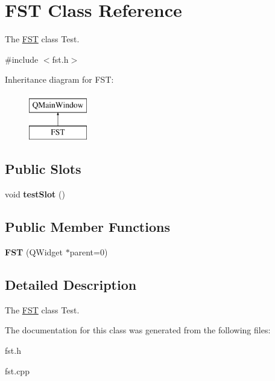 \hypertarget{classFST}{\section{F\-S\-T Class Reference}
\label{classFST}
}


The \hyperlink{classFST}{F\-S\-T} class Test.  




{\ttfamily \#include $<$fst.\-h$>$}

Inheritance diagram for F\-S\-T\-:\begin{figure}[H]
\begin{center}
\leavevmode
\includegraphics[height=2.000000cm]{classFST}
\end{center}
\end{figure}
\subsection*{Public Slots}
\begin{DoxyCompactItemize}
\item 
\hypertarget{classFST_a344cc8383100c7e3c0173c231550c122}{void {\bfseries test\-Slot} ()}\label{classFST_a344cc8383100c7e3c0173c231550c122}

\end{DoxyCompactItemize}
\subsection*{Public Member Functions}
\begin{DoxyCompactItemize}
\item 
\hypertarget{classFST_aa66ec3f3f9e425bea2ede95991d025c8}{{\bfseries F\-S\-T} (Q\-Widget $\ast$parent=0)}\label{classFST_aa66ec3f3f9e425bea2ede95991d025c8}

\end{DoxyCompactItemize}


\subsection{Detailed Description}
The \hyperlink{classFST}{F\-S\-T} class Test. 

The documentation for this class was generated from the following files\-:\begin{DoxyCompactItemize}
\item 
fst.\-h\item 
fst.\-cpp\end{DoxyCompactItemize}
